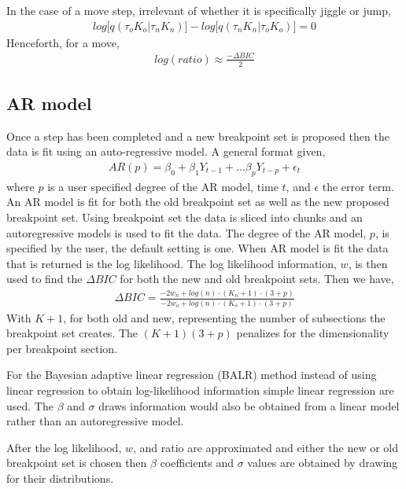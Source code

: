 \documentclass[submit]{smj}
\begin{document}
In the case of a move step, irrelevant of whether it is specifically jiggle or jump, 
\begin{align*} 
log \big[ q(\tau_{o} K_{o} | \tau_{n} K_{n}) \big] - log \big[ q(\tau_{n} K_{n}| \tau_{o} K_{o})  \big] = 0 
\end{align*}
Henceforth, for a move, 
\begin{align*}
log(ratio) \approx \frac{- \Delta BIC}{2} 
\end{align*}

\subsection{AR model}
Once a step has been completed and a new breakpoint set is proposed then the data is fit using an auto-regressive model. A general format given,
\begin{align*}
AR(p) = \beta_0 + \beta_1 Y_{t-1} + \dots \beta_{p} Y_{t- p} + \epsilon_t
\end{align*}
where $p$ is a user specified degree of the AR model, time $t$, and $\epsilon$ the error term. 
An AR model is fit for both the old breakpoint set as well as the new proposed breakpoint set. Using breakpoint set the data is sliced into chunks and an autoregressive models is used to fit the data. The degree of the AR model, $p$, is specified by the user, the default setting is one. When AR model is fit the data that is returned is the log likelihood. The log likelihood information, $w$, is then used to find the $\Delta BIC$ for both the new and old breakpoint sets. Then we have,
\begin{align*}
\Delta BIC = \frac{-2 w_n + log(n) \cdot (K_n +1) \cdot (3 + p) }{-2 w_o+ log(n) \cdot (K_o +1 ) \cdot ( 3 + p) }
\end{align*}
With $K+1$, for both old and new, representing the number of subsections the breakpoint set creates. The $(K+1)(3 +p)$ penalizes for the dimensionality per breakpoint section.

For the Bayesian adaptive linear regression (BALR) method instead of using linear regression to obtain log-likelihood information simple linear regression are used. The $\beta$ and $\sigma$ draws information would also be obtained from a linear model rather than an autoregressive model. 

After the log likelihood, $w$, and ratio are approximated and either the new or old breakpoint set is chosen then $\beta$ coefficients and $\sigma$ values are obtained by drawing for their distributions.  
\end{document}
